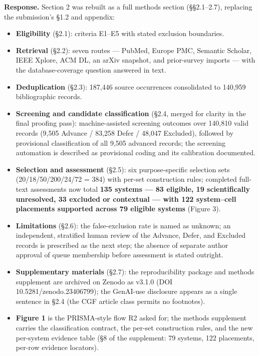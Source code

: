 \documentclass[11pt]{article}
\begin{document}
\textbf{Response.} Section 2 was rebuilt as a full methods section (\S\S2.1--2.7), replacing the submission's \S1.2 and appendix:
\begin{itemize}[leftmargin=*]
\item \textbf{Eligibility} (\S2.1): criteria E1--E5 with stated exclusion boundaries.
\item \textbf{Retrieval} (\S2.2): seven routes — PubMed, Europe PMC, Semantic Scholar, IEEE Xplore, ACM DL, an arXiv snapshot, and prior-survey imports — with the database-coverage question answered in text.
\item \textbf{Deduplication} (\S2.3): 187,446 source occurrences consolidated to 140,959 bibliographic records.
\item \textbf{Screening and candidate classification} (\S2.4, merged for clarity in the final proofing pass): machine-assisted screening outcomes over 140,810 valid records (9,505 Advance / 83,258 Defer / 48,047 Excluded), followed by provisional classification of all 9,505 advanced records; the screening automation is described as provisional coding and its calibration documented.
\item \textbf{Selection and assessment} (\S2.5): six purpose-specific selection sets (20/18/50/200/24/72 = 384) with per-set construction rules; completed full-text assessments now total \textbf{135 systems — 83 eligible, 19 scientifically unresolved, 33 excluded or contextual — with 122 system--cell placements supported across 79 eligible systems} (Figure 3).
\item \textbf{Limitations} (\S2.6): the false-exclusion rate is named as unknown; an independent, stratified human review of the Advance, Defer, and Excluded records is prescribed as the next step; the absence of separate author approval of queue membership before assessment is stated outright.
\item \textbf{Supplementary materials} (\S2.7): the reproducibility package and methods supplement are archived on Zenodo as v3.1.0 (DOI 10.5281/zenodo.23406799); the GenAI-use disclosure appears as a single sentence in \S2.4 (the CGF article class permits no footnotes).
\item \textbf{Figure 1} is the PRISMA-style flow R2 asked for; the methods supplement carries the classification contract, the per-set construction rules, and the new per-system evidence table (\S8 of the supplement: 79 systems, 122 placements, per-row evidence locators).
\end{itemize}
\end{document}
